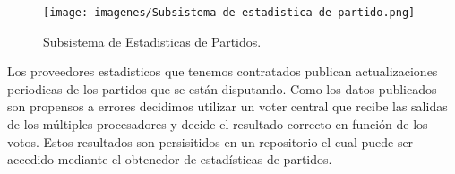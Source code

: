 \begin{figure}[H]
  \centering
  \texttt{[image: imagenes/Subsistema-de-estadistica-de-partido.png]}
  \caption{Subsistema de Estadisticas de Partidos.}
\end{figure}

Los proveedores estadisticos que tenemos contratados publican actualizaciones periodicas de los partidos que se están disputando.
Como los datos publicados son propensos a errores decidimos utilizar un voter central que recibe las salidas de los múltiples procesadores y decide el
resultado correcto en función de los votos. Estos resultados son persisitidos en un repositorio el cual puede ser accedido mediante el obtenedor de
estadísticas de partidos.

